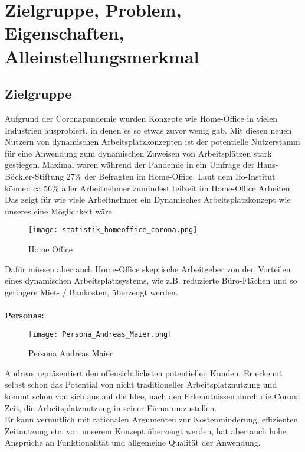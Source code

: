 \chapter{Zielgruppe, Problem, Eigenschaften, Alleinstellungsmerkmal}

\section{Zielgruppe}

Aufgrund der Coronapandemie wurden Konzepte wie Home-Office in vielen Industrien ausprobiert, in denen es so etwas zuvor wenig gab.
Mit diesen neuen Nutzern von dynamischen Arbeitsplatzkonzepten ist der potentielle Nutzerstamm für eine Anwendung zum dynamischen Zuweisen von Arbeitsplätzen stark gestiegen.
Maximal waren während der Pandemie in ein Umfrage der Hans-Böckler-Stiftung 27\% der Befragten im Home-Office.
Laut dem Ifo-Institut können ca 56\% aller Arbeitnehmer zumindest teilzeit im Home-Office Arbeiten. 
Das zeigt für wie viele Arbeitnehmer ein Dynamisches Arbeitsplatzkonzept wie unseres eine Möglichkeit wäre.

\begin{figure}[!h]
    \centering
    \texttt{[image: statistik\_homeoffice\_corona.png]}
    \caption{Home Office}
    \label{fig:HomeOffice}
\end{figure}

Dafür müssen aber auch Home-Office skeptische Arbeitgeber von den Vorteilen eines dynamischen Arbeitsplatzsystems, wie z.B. reduzierte Büro-Flächen und so geringere Miet- / Baukosten, überzeugt werden.
\\
\\
\textbf{Personas: }

\begin{figure}[!h]
    \centering
    \texttt{[image: Persona\_Andreas\_Maier.png]}
    \caption{Persona Andreas Maier}
    \label{fig:PersonaAndreasMaier}
\end{figure}

Andreas repräsentiert den offensichtlichsten potentiellen Kunden.
Er erkennt selbst schon das Potential von nicht traditioneller Arbeitsplatznutzung und kommt schon von sich aus auf die Idee, nach den Erkenntnissen durch die Corona Zeit, die Arbeitsplatznutzung in seiner Firma umzustellen.\\
Er kann vermutlich mit rationalen Argumenten zur Kostenminderung, effizienten Zeitnutzung etc. von unserem Konzept überzeugt werden, hat aber auch hohe Ansprüche an Funktionalität und allgemeine Qualität der Anwendung.

